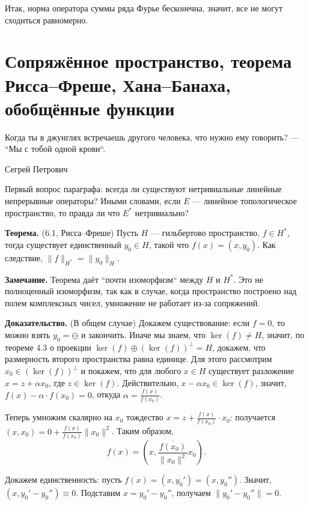 Итак, норма оператора суммы ряда Фурье бесконечна, значит, все не могут сходиться равномерно.

\section{Сопряжённое пространство, теорема Рисса--Фреше, Хана--Банаха, обобщённые функции}
\epigraph{Когда ты в джунглях встречаешь другого человека, что нужно ему говорить?
--- ``Мы с тобой одной крови``.
}{Сегрей Петрович}

Первый вопрос параграфа: всегда ли существуют нетривиальные линейные непрерывные операторы?
Иными словами, если $E$ --- линейное топологическое пространство, то правда ли что $E^*$ нетривиально?

\textbf{Теорема.} (6.1, Рисса--Фреше) Пусть $H$ --- гильбертово пространство, $f \in H^*$, тогда существует единственный $y_0 \in H$, такой что $f(x) = (x,y_0)$.
Как следствие, $\|f\|_{H^*} = \|y_0\|_H$.

\textbf{Замечание.} Теорема даёт ``почти изоморфизм`` между $H$ и $H^*$.
Это не полноценный изоморфизм, так как в случае, когда пространство построено над полем комплексных чисел, умножение не работает из-за сопряжений.

\textbf{Доказательство.} (В общем случае)
Докажем существование: если $f = 0$, то можно взять $y_0 = \ominus$ и закончить.
Иначе мы знаем, что $\ker(f) \ne H$, значит, по теореме 4.3 о проекции $\ker(f) \oplus (\ker(f))^\bot = H$, докажем, что размерность второго пространства равна единице.
Для этого рассмотрим $x_0 \in (\ker(f))^\bot$ и покажем, что для любого $x \in H$ существует разложение $x = z + \alpha x_0$, где $z \in \ker(f)$.
Действительно, $x - \alpha x_0 \in \ker(f)$, значит, $f(x) - \alpha \cdot f(x_0) = 0$, откуда $\alpha = \frac{f(x)}{f(x_0)}$.

Теперь умножим скалярно на $x_0$ тождество $x = z + \frac{f(x)}{f(x_0)} \cdot x_0$: получается $(x, x_0) = 0 + \frac{f(x)}{f(x_0)} \|x_0\|^2$.
Таким образом,
\[
    f(x) = \left(x, \frac{\overline{f(x_0)}}{\|x_0\|^2} x_0 \right).
\]

Докажем единственность: пусть $f(x) = (x, y_0') = (x, y_0'')$.
Значит, $(x, y_0' - y_0'') \equiv 0$.
Подставим $x = y_0' - y_0''$, получаем $\|y_0' - y_0''\| = 0$.

\QED

